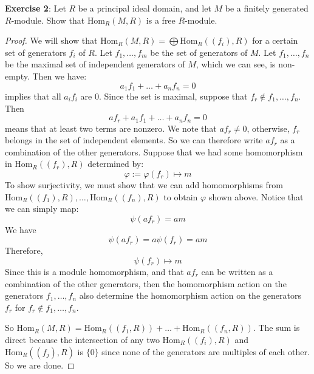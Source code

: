 \documentclass{article}
\begin{document}
\textbf{Exercise 2}: Let $R$ be a principal ideal domain, and let $M$ be a finitely generated $R$-module. Show that $\text{Hom}_{R}(M, R)$ is a free $R$-module.
    \begin{proof}
        We will show that $\text{Hom}_{R}(M, R) = \bigoplus \text{Hom}_{R}((f_{i}), R)$ for a certain set of generators $f_{i}$ of $R$. Let $f_{1}, \ldots, f_{m}$ be the set of generators of $M$. Let $f_{1}, \ldots, f_{n}$ be the maximal set of independent generators of $M$, which we can see, is non-empty. Then we have:
            \begin{equation*}
                a_{1}f_{1} + \ldots + a_{n}f_{n} = 0
            \end{equation*}
        implies that all $a_{i}f_{i}$ are $0$. Since the set is maximal, suppose that $f_{r} \notin f_{1}, \ldots, f_{n}$. Then
            \begin{equation*}
                af_{r} + a_{1}f_{1} + \ldots + a_{n}f_{n} = 0
            \end{equation*}
        means that at least two terms are nonzero. We note that $af_{r} \neq 0$, otherwise, $f_{r}$ belongs in the set of independent elements. So we can therefore write $af_{r}$ as a combination of the other generators. Suppose that we had some homomorphism in $\text{Hom}_{R}((f_{r}), R)$ determined by:
            \begin{equation*}
                \varphi:= \varphi(f_{r}) \mapsto m
            \end{equation*}
        To show surjectivity, we must show that we can add homomorphisms from $\text{Hom}_{R}((f_{1}), R), \ldots, \text{Hom}_{R}((f_{n}), R)$ to obtain $\varphi$ shown above. Notice that we can simply map:
            \begin{equation*}
                \psi(af_{r}) = am
            \end{equation*}
        We have
            \begin{equation*}
                \psi(af_{r}) = a\psi(f_{r}) = am
            \end{equation*}
        Therefore,
            \begin{equation*}
                \psi(f_{r}) \mapsto m
            \end{equation*}
        Since this is a module homomorphism, and that $af_{r}$ can be written as a combination of the other generators, then the homomorphism action on the generators $f_{1}, \ldots, f_{n}$ also determine the homomorphism action on the generators $f_{r}$ for $f_{r} \notin f_{1}, \ldots, f_{n}$.

        So $\text{Hom}_{R}(M, R) = \text{Hom}_{R}((f_{1}, R)) + \ldots + \text{Hom}_{R}((f_{n}, R))$. The sum is direct because the intersection of any two $\text{Hom}_{R}((f_{i}), R)$ and $\text{Hom}_{R}((f_{j}), R)$ is $\{0\}$ since none of the generators are multiples of each other. So we are done.
    \end{proof}
\end{document}
